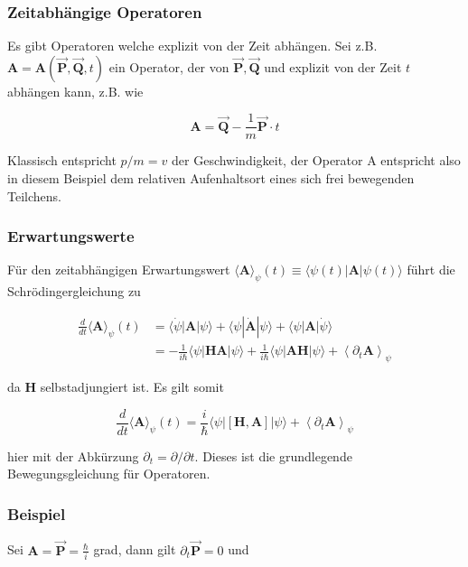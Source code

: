 \documentclass[10pt, letterpaper]{article}
\begin{document}
\subsubsection*{Zeitabhängige Operatoren}
Es gibt Operatoren welche explizit von der Zeit abhängen. Sei z.B. $\mathbf{A}=\mathbf{A}(\overrightarrow{\mathbf{P}}, \overrightarrow{\mathbf{Q}}, t)$ ein Operator, der von $\overrightarrow{\mathbf{P}}, \overrightarrow{\mathbf{Q}}$ und explizit von der Zeit $t$ abhängen kann, z.B. wie

$$
\mathbf{A}=\overrightarrow{\mathbf{Q}}-\frac{1}{m} \overrightarrow{\mathbf{P}} \cdot t
$$

Klassisch entspricht $p / m=v$ der Geschwindigkeit, der Operator A entspricht also in diesem Beispiel dem relativen Aufenhaltsort eines sich frei bewegenden Teilchens.

\subsubsection*{Erwartungswerte}
Für den zeitabhängigen Erwartungswert $\langle\mathbf{A}\rangle_{\psi}(t) \equiv\langle\psi(t)| \mathbf{A}|\psi(t)\rangle$ führt die Schrödingergleichung zu

$$
\begin{aligned}
\frac{d}{d t}\langle\mathbf{A}\rangle_{\psi}(t) & =\langle\dot{\psi}| \mathbf{A}|\psi\rangle+\langle\psi| \dot{\mathbf{A}}|\psi\rangle+\langle\psi| \mathbf{A}|\dot{\psi}\rangle \\
& =-\frac{1}{i \hbar}\langle\psi| \mathbf{H A}|\psi\rangle+\frac{1}{i \hbar}\langle\psi| \mathbf{A H}|\psi\rangle+\left\langle\partial_{t} \mathbf{A}\right\rangle_{\psi}
\end{aligned}
$$

da $\mathbf{H}$ selbstadjungiert ist. Es gilt somit

$$
\frac{d}{d t}\langle\mathbf{A}\rangle_{\psi}(t)=\frac{i}{\hbar}\langle\psi|[\mathbf{H}, \mathbf{A}]|\psi\rangle+\left\langle\partial_{t} \mathbf{A}\right\rangle_{\psi}
$$

hier mit der Abkürzung $\partial_{t}=\partial / \partial t$. Dieses ist die grundlegende Bewegungsgleichung für Operatoren.

\subsubsection*{Beispiel}
Sei $\mathbf{A}=\overrightarrow{\mathbf{P}}=\frac{\hbar}{i}$ grad, dann gilt $\partial_{t} \overrightarrow{\mathbf{P}}=0$ und
\end{document}
